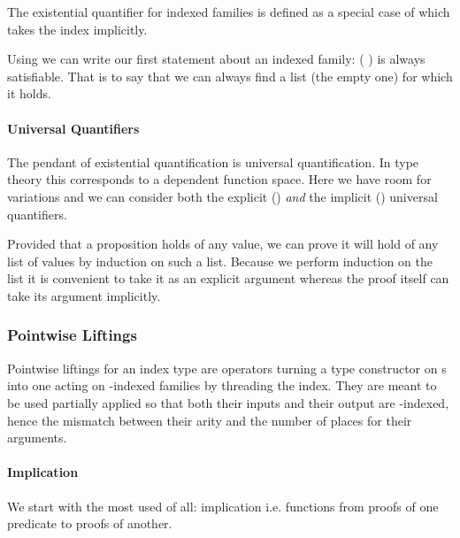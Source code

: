 
The existential quantifier for indexed families is defined as a special
case of  which takes the index  implicitly.


Using  we can write our first statement about an indexed family:
{( )} is always satisfiable. That is to say that we can always
find a list (the empty one) for which it holds.


\paragraph{Universal Quantifiers} The pendant of existential quantification
is universal quantification. In type theory this corresponds to a dependent
function space. Here we have room for variations and we can consider both
the explicit () \emph{and} the implicit () universal
quantifiers.


Provided that a proposition holds of any value, we can prove it will hold
of any list of values by induction on such a list. Because we perform
induction on the list it is convenient to take it as an explicit argument
whereas the proof itself can take its argument implicitly.


\subsubsection{Pointwise Liftings}

Pointwise liftings for an index type  are operators turning a type
constructor on s into one acting on -indexed families by
threading the index. They are meant to be used partially applied so that
both their inputs and their output are -indexed, hence the mismatch
between their arity and the number of places for their arguments.

\paragraph{Implication} We start with the most used of all: implication
i.e. functions from proofs of one predicate to proofs of another.

